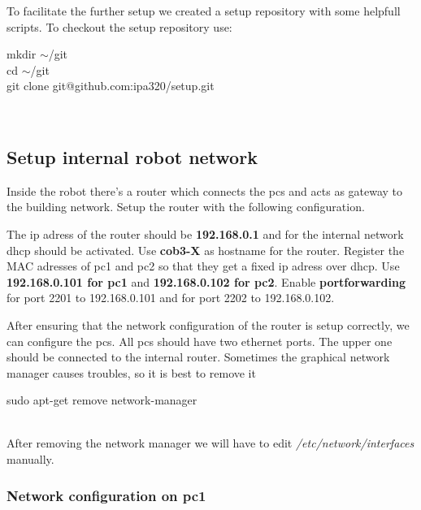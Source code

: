 To facilitate the further setup we created a setup repository with some helpfull scripts. To checkout the setup repository use:

\colorbox{light-gray} {
\begin{minipage}{1.0\textwidth} 
	mkdir $\sim$/git \\
	cd $\sim$/git \\
	git clone git@github.com:ipa320/setup.git	
\end{minipage} } \\

\subsection{Setup internal robot network}
Inside the robot there's a router which connects the pcs and acts as gateway to the building network. Setup the router with the following configuration. 

The ip adress of the router should be \textbf{192.168.0.1} and for the internal network dhcp should be activated. Use \textbf{cob3-X} as hostname for the router. Register the MAC adresses of pc1 and pc2 so that they get a fixed ip adress over dhcp. Use \textbf{192.168.0.101 for pc1} and \textbf{192.168.0.102 for pc2}. Enable \textbf{portforwarding} for port 2201 to 192.168.0.101 and for port 2202 to 192.168.0.102.

After ensuring that the network configuration of the router is setup correctly, we can configure the pcs. All pcs should have two ethernet ports. The upper one should be connected to the internal router. Sometimes the graphical network manager causes troubles, so it is best to remove it

\colorbox{light-gray} {
\begin{minipage}{1.0\textwidth} 
	sudo apt-get remove network-manager
\end{minipage} } \\

After removing the network manager we will have to edit \textit{/etc/network/interfaces} manually. 

\subsubsection{Network configuration on pc1}


